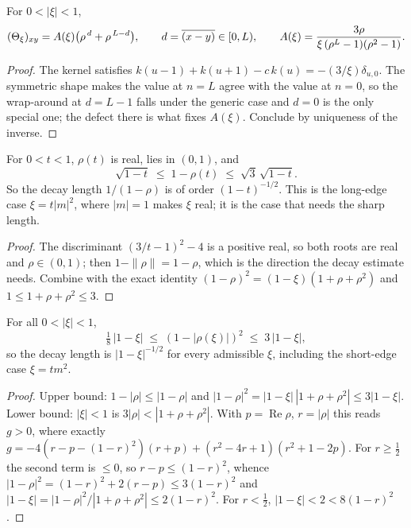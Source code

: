 \begin{lemma}\label{lem:closed-form}
  \leanok
  For $0 < |\xi| < 1$,
  \[ (\Theta_\xi)_{xy} = A(\xi)\bigl(\rho^{\,d} + \rho^{\,L-d}\bigr),\qquad
     d = \overline{(x-y)} \in [0,L),\qquad
     A(\xi) = \frac{3\rho}{\xi\,(\rho^L-1)(\rho^2-1)} . \]
\end{lemma}
\begin{proof}\leanok{}
  The kernel satisfies $k(u-1) + k(u+1) - c\,k(u) = -(3/\xi)\delta_{u,0}$.  The
  symmetric shape makes the value at $n=L$ agree with the value at $n=0$, so the
  wrap-around at $d = L-1$ falls under the generic case and $d = 0$ is the only
  special one; the defect there is what fixes $A(\xi)$.  Conclude by uniqueness
  of the inverse.
\end{proof}

\begin{lemma}\label{lem:rho-rate}
  \leanok{}
  For $0 < t < 1$, $\rho(t)$ is real, lies in $(0,1)$, and
  \[ \sqrt{1-t} \;\le\; 1 - \rho(t) \;\le\; \sqrt3\,\sqrt{1-t} . \]
  So the decay length $1/(1-\rho)$ is of order $(1-t)^{-1/2}$.  This is the
  long-edge case $\xi = t|m|^2$, where $|m| = 1$ makes $\xi$ real; it is the case
  that needs the sharp length.
\end{lemma}
\begin{proof}\leanok{}
  The discriminant $(3/t-1)^2 - 4$ is a positive real, so both roots are real and
  $\rho \in (0,1)$; then $1 - \|\rho\| = 1 - \rho$, which is the direction the
  decay estimate needs.  Combine with the exact identity
  $(1-\rho)^2 = (1-\xi)(1+\rho+\rho^2)$ and $1 \le 1+\rho+\rho^2 \le 3$.
\end{proof}

\begin{lemma}\label{lem:rho-rate-complex}
  \leanok{}
  For all $0<|\xi|<1$,
  \[ \tfrac18\,|1-\xi| \;\le\; (1-|\rho(\xi)|)^2 \;\le\; 3\,|1-\xi| , \]
  so the decay length is $|1-\xi|^{-1/2}$ for every admissible $\xi$, including the
  short-edge case $\xi=tm^2$.
\end{lemma}
\begin{proof}\leanok{}
  Upper bound: $1-|\rho|\le|1-\rho|$ and $|1-\rho|^2=|1-\xi|\,|1+\rho+\rho^2|\le3|1-\xi|$.
  Lower bound: $|\xi|<1$ is $3|\rho|<|1+\rho+\rho^2|$.  With $p=\operatorname{Re}\rho$,
  $r=|\rho|$ this reads $g>0$, where exactly
  $g=-4(r-p-(1-r)^2)(r+p)+(r^2-4r+1)(r^2+1-2p)$.  For $r\ge\frac12$ the second term is
  $\le0$, so $r-p\le(1-r)^2$, whence $|1-\rho|^2=(1-r)^2+2(r-p)\le3(1-r)^2$ and
  $|1-\xi|=|1-\rho|^2/|1+\rho+\rho^2|\le2(1-r)^2$.  For $r<\frac12$, $|1-\xi|<2<8(1-r)^2$.
\end{proof}

